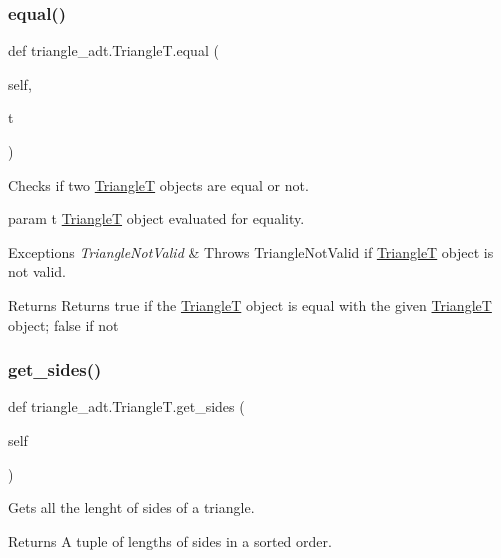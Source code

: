 \subsubsection{\texorpdfstring{equal()}{equal()}}
{\footnotesize\ttfamily def triangle\+\_\+adt.\+Triangle\+T.\+equal (\begin{DoxyParamCaption}\item[{}]{self,  }\item[{}]{t }\end{DoxyParamCaption})}



Checks if two \hyperlink{classtriangle__adt_1_1_triangle_t}{TriangleT} objects are equal or not. 

param t \hyperlink{classtriangle__adt_1_1_triangle_t}{TriangleT} object evaluated for equality. 
\begin{DoxyExceptions}{Exceptions}
{\em Triangle\+Not\+Valid} & Throws Triangle\+Not\+Valid if \hyperlink{classtriangle__adt_1_1_triangle_t}{TriangleT} object is not valid. \\
\hline
\end{DoxyExceptions}
\begin{DoxyReturn}{Returns}
Returns true if the \hyperlink{classtriangle__adt_1_1_triangle_t}{TriangleT} object is equal with the given \hyperlink{classtriangle__adt_1_1_triangle_t}{TriangleT} object; false if not 
\end{DoxyReturn}
\mbox{\label{classtriangle__adt_1_1_triangle_t_a598e20e41e186231c9103a6249f9eeb6}} 
\subsubsection{\texorpdfstring{get\+\_\+sides()}{get\_sides()}}
{\footnotesize\ttfamily def triangle\+\_\+adt.\+Triangle\+T.\+get\+\_\+sides (\begin{DoxyParamCaption}\item[{}]{self }\end{DoxyParamCaption})}



Gets all the lenght of sides of a triangle. 

\begin{DoxyReturn}{Returns}
A tuple of lengths of sides in a sorted order. 
\end{DoxyReturn}
\mbox{\label{classtriangle__adt_1_1_triangle_t_a2edd73d4eb4aedae932161c1befb5c63}} 
